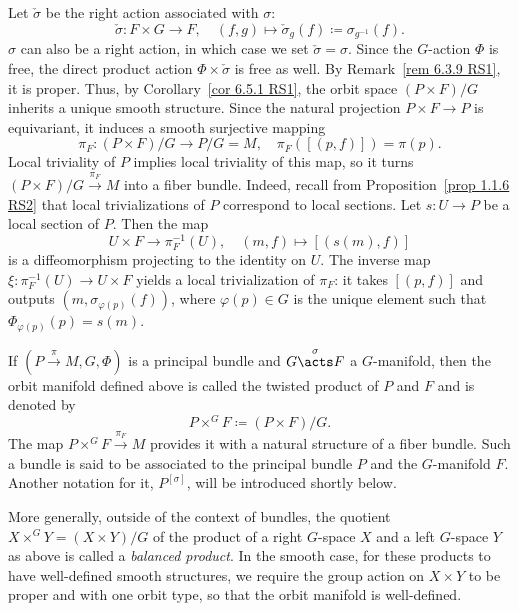 Let $\check\sigma$ be the right action associated with $\sigma$:
\[\check\sigma:F\times G\to F,\quad (f,g)\mapsto \check{\sigma}_g(f)\coloneqq \sigma_{g^{-1}}(f).\]
$\sigma$ can also be a right action, in which case we set $\check\sigma=\sigma$. Since the $G$-action $\Phi$ is free, the direct product action $\Phi\times \check\sigma$ is free as well. By Remark~\ref{rem 6.3.9 RS1}, it is proper. Thus, by Corollary~\ref{cor 6.5.1 RS1}, the orbit space $(P\times F)\slash G$ inherits a unique smooth structure. Since the natural projection $P\times F\to P$ is equivariant, it induces a smooth surjective mapping
\[\pi_F:(P\times F)\slash G\to P\slash G=M,\quad \pi_F([(p,f)])=\pi(p).\]
Local triviality of $P$ implies local triviality of this map, so it turns $(P\times F)\slash G \overset{\pi_F}{\to } M$ into a fiber bundle. Indeed, recall from Proposition~\ref{prop 1.1.6 RS2} that local trivializations of $P$ correspond to local sections. Let $s:U\to P$ be a local section of $P$. Then the map
\[U\times F\to \pi_F^{-1}(U),\quad (m,f)\mapsto [(s(m),f)]\]
is a diffeomorphism projecting to the identity on $U$. The inverse map $\xi:\pi_F^{-1}(U)\to U\times F$ yields a local trivialization of $\pi_F$: it takes $[(p,f)]$ and outputs $(m,\sigma_{\varphi(p)}(f))$, where $\varphi(p)\in G$ is the unique element such that $\Phi_{\varphi(p)}(p)=s(m)$.

\begin{defn}
    If $(P\overset{\pi}{\to}M,G,\Phi)$ is a principal bundle and  $G\overset{\sigma}{\acts}F$ a $G$-manifold, then the orbit manifold defined above is called the twisted product of $P$ and $F$ and is denoted by
    \[P\times^G F\coloneqq (P\times F)\slash G.\]
    The map $P\times^G F\overset{\pi_F}{\to } M$ provides it with a natural structure of a fiber bundle. Such a bundle is said to be associated to the principal bundle $P$ and the $G$-manifold $F$. Another notation for it, $P^{[\sigma]}$, will be introduced shortly below.
\end{defn}

More generally, outside of the context of bundles, the quotient $X\times^G Y=(X\times Y)\slash G$ of the product of a right $G$-space $X$ and a left $G$-space $Y$ as above is called a \emph{balanced product}. In the smooth case, for these products to have well-defined smooth structures, we require the group action on $X\times Y$ to be proper and with one orbit type, so that the orbit manifold is well-defined.

